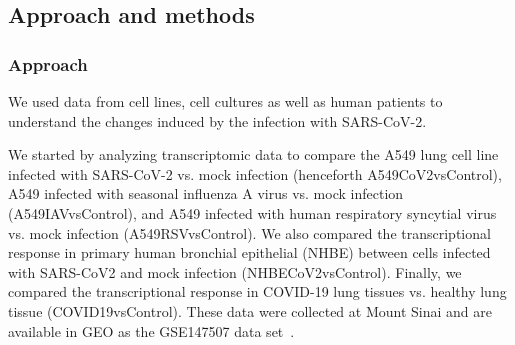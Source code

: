 





\subsection{Approach and methods}

\subsubsection{Approach}

We used data from cell lines, cell cultures as well as human patients to understand the changes induced by the infection with SARS-CoV-2. 


We started by analyzing transcriptomic data to compare the A549 lung cell line infected with SARS-CoV-2 vs. mock infection  (henceforth A549CoV2vsControl), A549 infected with seasonal influenza A virus vs. mock infection   (A549IAVvsControl), and A549 infected with human respiratory syncytial virus vs. mock infection  (A549RSVvsControl). We also compared the transcriptional response in primary human bronchial epithelial (NHBE) between cells infected with SARS-CoV2 and mock infection  (NHBECoV2vsControl). Finally, we compared the transcriptional response in COVID-19 lung tissues vs. healthy lung tissue  (COVID19vsControl). 
These data were collected at Mount Sinai and are available in GEO as the GSE147507 data set~\cite{Blanco-Melo:2020}. 

